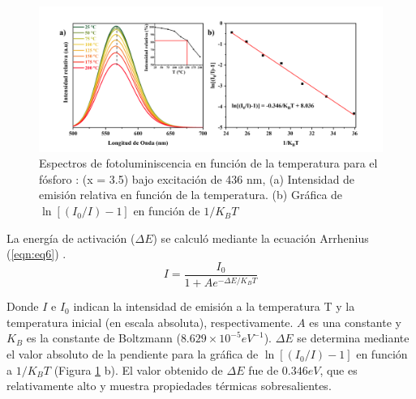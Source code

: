 \begin{figure}[h]
    \centering%

    \includegraphics[width=\textwidth]{Kap4/fotoTemperatura.png}%
    \caption{Espectros de fotoluminiscencia en función de la temperatura para
    el fósforo : (x = 3.5) bajo
    excitación
    de 436 nm, (a) Intensidad de emisión relativa en función de la temperatura.
    (b)
    Gráfica de $\ln[(I_{0}/I)-1]$ en función de $1/K_BT$}\label{fig:fotoTemp}
\end{figure}

La energía de activación ($\Delta E$) se calculó mediante la ecuación Arrhenius
(\ref{eqn:eq6}) \cite{Chen2015}.\\

\begin{equation}
    I=\frac{I_0}{1+A e^{-\Delta E/K_BT}}
    \label{eqn:eq6}
\end{equation}

Donde $I$ e $I_0$ indican la intensidad de emisión a la temperatura T y la
temperatura inicial (en escala absoluta), respectivamente. $A$ es una constante
y
$K_B$ es la constante de Boltzmann ($8.629×10^{-5} eV^{-1}$). $\Delta E$ se
determina mediante el
valor absoluto de la pendiente para la gráfica de $\ln [(I_0/I)-1] $ en función
a $1/K_{B}T$ (Figura \ref{fig:fotoTemp} b). El valor obtenido de $\Delta E$ fue
de $0.346 eV$, que es relativamente
alto y
muestra propiedades térmicas sobresalientes.\\